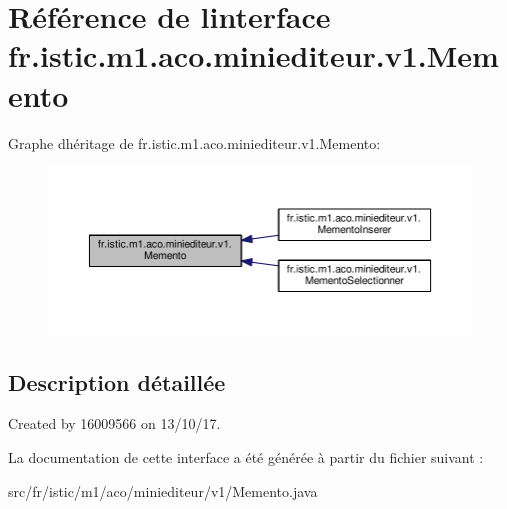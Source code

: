 \hypertarget{interfacefr_1_1istic_1_1m1_1_1aco_1_1miniediteur_1_1v1_1_1Memento}{}\section{Référence de l\textquotesingle{}interface fr.\+istic.\+m1.\+aco.\+miniediteur.\+v1.\+Memento}
\label{interfacefr_1_1istic_1_1m1_1_1aco_1_1miniediteur_1_1v1_1_1Memento}


Graphe d\textquotesingle{}héritage de fr.\+istic.\+m1.\+aco.\+miniediteur.\+v1.\+Memento\+:\nopagebreak
\begin{figure}[H]
\begin{center}
\leavevmode
\includegraphics[width=350pt]{interfacefr_1_1istic_1_1m1_1_1aco_1_1miniediteur_1_1v1_1_1Memento__inherit__graph}
\end{center}
\end{figure}


\subsection{Description détaillée}
Created by 16009566 on 13/10/17. 

La documentation de cette interface a été générée à partir du fichier suivant \+:\begin{DoxyCompactItemize}
\item 
src/fr/istic/m1/aco/miniediteur/v1/Memento.\+java\end{DoxyCompactItemize}
